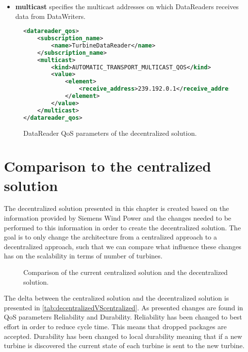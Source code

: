 \begin{itemize}
	\item \textbf{multicast} specifies the multicast addresses on which DataReaders receives data from DataWriters. 
\end{itemize}

\begin{figure}[!t]
\begin{lstlisting}[language=XML]
<datareader_qos>
	<subscription_name>
		<name>TurbineDataReader</name>
	</subscription_name>
	<multicast>
		<kind>AUTOMATIC_TRANSPORT_MULTICAST_QOS</kind>
		<value>
			<element>
				<receive_address>239.192.0.1</receive_address>
			</element>
		</value>
	</multicast>
</datareader_qos>
\end{lstlisting}
\caption[Decentralized DataReader QoS parameters]{
		\label{fig:decDataReaderQos} 
		\footnotesize{DataReader QoS parameters of the decentralized solution.}
	}
\end{figure}

\section{Comparison to the centralized solution}
The decentralized solution presented in this chapter is created based on the information provided by Siemens Wind Power and the changes needed to be performed to this information in order to create the decentralized solution.
The goal is to only change the architecture from a centralized approach to a decentralized approach, such that we can compare what influence these changes has on the scalability in terms of number of turbines.

\begin{figure}[!h]
	\centering
	
	\caption[Comparison of the current centralized solution and the decentralized solution]{
		\label{fig:projectDiffOverviewCentralizedDecentralized}
		\footnotesize{%
			Comparison of the current centralized solution and the decentralized solution.
		}
	}
\end{figure}


The delta between the centralized solution and the decentralized solution is presented in \cref{tab:decentralizedVScentralized}. As presented changes are found in QoS parameters Reliability and Durability. Reliability has been changed to best effort in order to reduce cycle time. This means that dropped packages are accepted. Durability has been changed to local durability meaning that if a new turbine is discovered the current state of each turbine is sent to the new turbine.

